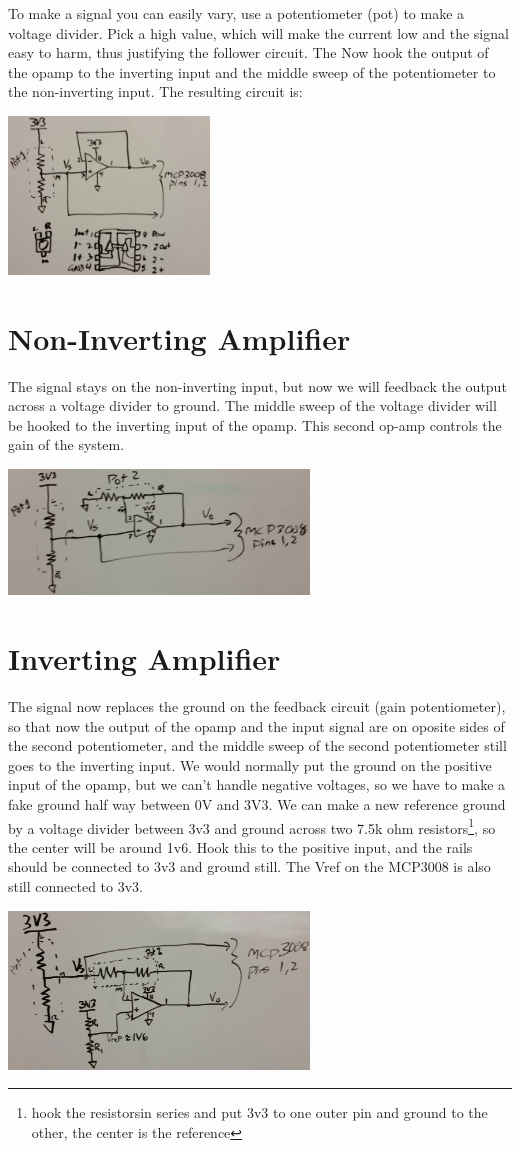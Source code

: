 To make a signal you can easily vary, use a potentiometer (pot) to make a voltage divider.  Pick a high value, which will make the current low and the signal easy to harm, thus justifying the follower circuit.  The Now hook the output of the opamp to the inverting input and the middle sweep of the potentiometer to the non-inverting input.  The resulting circuit is:

\includegraphics[width=0.4\textwidth]{../images/Follower.jpg}


\section{Non-Inverting Amplifier}

The signal stays on the non-inverting input, but now we will feedback the output across a voltage divider to ground.  The middle sweep of the voltage divider will be hooked to the inverting input of the opamp.  This second op-amp controls the gain of the system.

\includegraphics[width=0.6\textwidth]{../images/Non-Inverting.jpg}


\section{Inverting Amplifier}

The signal now replaces the ground on the feedback circuit (gain potentiometer), so that now the output of the opamp and the input signal are on oposite sides of the second potentiometer, and the middle sweep of the second potentiometer still goes to the inverting input.  We would normally put the ground on the positive input of the opamp, but we can't handle negative voltages, so we have to make a fake ground half way between 0V and 3V3.  We can make a new reference ground by a voltage divider between 3v3 and ground across two 7.5k ohm resistors\footnote{hook the resistorsin series and put 3v3 to one outer pin and ground to the other, the center is the reference}, so the center will be around 1v6.  Hook this to the positive input, and the rails should be connected to 3v3 and ground still.  The Vref on the MCP3008 is also still connected to 3v3.  

\includegraphics[width=0.6\textwidth]{../images/Inverting.jpg}

